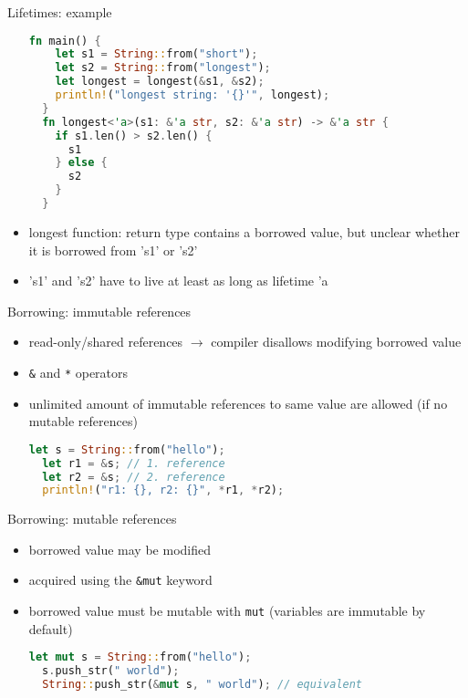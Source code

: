 \documentclass{beamer}
\begin{document}
\begin{frame}[fragile]{Lifetimes: example}
\begin{itemize}
  \begin{lstlisting}[language=Rust]
  fn main() {
    let s1 = String::from("short");
    let s2 = String::from("longest");
    let longest = longest(&s1, &s2);
    println!("longest string: '{}'", longest);
  }
  fn longest<'a>(s1: &'a str, s2: &'a str) -> &'a str {
    if s1.len() > s2.len() {
      s1
    } else {
      s2
    }
  }
  \end{lstlisting}
  \item longest function: return type contains a borrowed value, but unclear whether it is borrowed from 's1' or 's2'
  \item 's1' and 's2' have to live at least as long as lifetime 'a
\end{itemize}
\end{frame}


\begin{frame}[fragile]{Borrowing: immutable references}
\begin{itemize}
  \item read-only/shared references $\rightarrow$ compiler disallows modifying borrowed value
  \item \verb|&| and \verb|*| operators
  \item unlimited amount of immutable references to same value are allowed (if no mutable references)

  \begin{lstlisting}[language=Rust]
  let s = String::from("hello");
  let r1 = &s; // 1. reference
  let r2 = &s; // 2. reference
  println!("r1: {}, r2: {}", *r1, *r2);
  \end{lstlisting}
\end{itemize}
\end{frame}


\begin{frame}[fragile]{Borrowing: mutable references}
\begin{itemize}
  \item borrowed value may be modified
  \item acquired using the \verb|&mut| keyword
  \item borrowed value must be mutable with \verb|mut| (variables are immutable by default)

  \begin{lstlisting}[language=Rust]
  let mut s = String::from("hello");
  s.push_str(" world");
  String::push_str(&mut s, " world"); // equivalent
  \end{lstlisting}
\end{itemize}
\end{frame}
\end{document}
